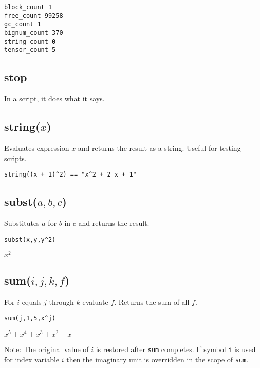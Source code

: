 \bigskip
\noindent
\verb$block_count 1$\\
\verb$free_count 99258$\\
\verb$gc_count 1$\\
\verb$bignum_count 370$\\
\verb$string_count 0$\\
\verb$tensor_count 5$

\subsection*{stop}

In a script, it does what it says.

\subsection*{string($x$)}

Evaluates expression $x$ and returns the result as a string.
Useful for testing scripts.

{\color{blue}
\begin{verbatim}
string((x + 1)^2) == "x^2 + 2 x + 1"
\end{verbatim}
}


\subsection*{subst($a,b,c$)}

Substitutes $a$ for $b$ in $c$ and returns the result.

{\color{blue}
\begin{verbatim}
subst(x,y,y^2)
\end{verbatim}
}

\noindent
$\displaystyle x^2$

\subsection*{sum($i,j,k,f$)}

For $i$ equals $j$ through $k$ evaluate $f$.
Returns the sum of all $f$.

{\color{blue}
\begin{verbatim}
sum(j,1,5,x^j)
\end{verbatim}
}

\noindent
$\displaystyle x^5+x^4+x^3+x^2+x$

\bigskip
\noindent
Note: The original value of $i$ is restored after {\tt sum} completes.
If symbol {\tt i} is used for index variable $i$
then the imaginary unit is overridden in the scope of {\tt sum}.

